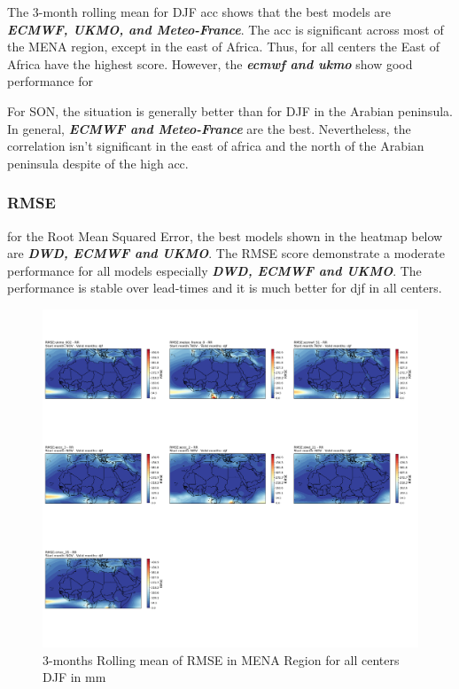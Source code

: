 The 3-month rolling mean for DJF acc shows that the best models are \textbf{\textit{ECMWF, UKMO, and Meteo-France}}. The acc is significant across most of the MENA region, except in the east of Africa. Thus, for all centers the East of Africa have the highest score. However, the \textbf{\textit{ecmwf and ukmo}} show good performance for 


 
For SON, the situation is generally better than for DJF in the Arabian peninsula. In general, \textbf{\textit{ECMWF and Meteo-France}} are the best. Nevertheless, the correlation isn't significant in the east of africa and the north of the Arabian peninsula despite of the high acc.


\subsubsection{RMSE}
 
for the Root Mean Squared Error, the best models shown in the heatmap below are \textbf{\textit{DWD, ECMWF and UKMO}}. The RMSE score demonstrate a moderate performance for all models especially \textbf{\textit{DWD, ECMWF and UKMO}}. The performance is stable over lead-times and it is much better for djf in all centers.

\begin{figure}[H]
\centering
\includegraphics[scale=0.3]{plots/det/rmse/rmse_djf_RR.png}
\caption{3-months Rolling mean of RMSE in MENA Region for all centers DJF in mm}
\end{figure}


